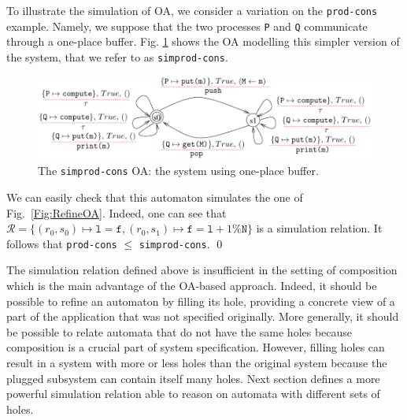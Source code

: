 \documentclass[runningheads]{llncs}
\begin{document}
\begin{example} \label{example:fifo-system-one}
To illustrate the simulation  of OA, we consider a variation on the \texttt{prod-cons} example. Namely,  we suppose that  the two processes  \texttt{P} and  \texttt{Q} communicate through a one-place  buffer. Fig. \ref{Fig:SpecOA} shows the OA modelling this simpler version of the system, that we refer to as \texttt{simprod-cons}. 
\begin{figure}[!b]
 \centering
   \includegraphics[width=.90\textwidth]{Figures/FIFOpen2.pdf}
   \caption{  The \texttt{simprod-cons} OA: the system using one-place  buffer.  \label{Fig:SpecOA}}
\end{figure}
We can easily check that this automaton simulates the one of Fig.~\ref{Fig:RefineOA}.
Indeed, one can see that  $\mathcal{R}=\{(r_0,s_0) \mapsto \texttt{l}=\texttt{f}, (r_0,s_1) \mapsto \texttt{f}=\texttt{l}+1\% \texttt{N} \}$ is  a  simulation 
relation. It follows that  \texttt{prod-cons} $\leq$ \texttt{simprod-cons}. \qed
\end{example}




The simulation relation defined above is insufficient in the setting of composition which is the main advantage of the OA-based approach. Indeed, it should be possible to refine an automaton by filling its hole, providing a concrete view of a part of the application that was not specified originally. 
More generally, it should be possible to relate automata that do not have the same holes because composition is a crucial part of system specification.
However, filling holes can result in a system with more or less holes than the original system because the plugged subsystem can contain itself many holes.
Next section  defines  a more powerful simulation relation able to reason on automata with different sets of holes.
\end{document}
